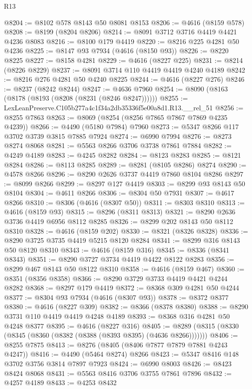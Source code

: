 \begin{lexlean}{R13}
\begin{coremodule}
@8204 := @8102 @578 @8143 @50 @8081 @8153
@8206 := @4616 (@8159 @578)
@8208 := @8199 (@8204 @8206)
@8214 := @8091 @3712 @3716 @4419 @4421 @4236 @8083
@8216 := @8100 @179 @4419
@8220 := @8216 @225 @4281 @50 @4236
@8225 := @8147 @93 @7934 (@4616 (@8150 @93))
@8226 := @8220 @8225
@8227 := @8158 @4281
@8229 := @4616 (@8227 @225)
@8231 := @8214 (@8226 @8229)
@8237 := @8091 @3714 @110 @4419 @4419 @4240 @4189
@8242 := @8216 @276 @4281 @50 @4240 @8225
@8244 := @4616 (@8227 @276)
@8246 := @8237 (@8242 @8244)
@8247 := @4636 @7960
@8254 := @8090 (@8163 (@8178 (@8193 (@8208 (@8231 (@8246 @8247))))))
@8255 := LexLeanPreserve.C105b277a4c1f34a2db35336f5e00a8d1.R13.__rel_51
@8256 := @8255 @7863
@8263 := @8069 (@8254 (@8256 @7865 @7867 @7869 @4235 @4239))
@8266 := @4490 (@5180 @7984) @7960
@8273 := @5347 @8266 @117 @3702 @3739 @3815 @7885 @7924
@8274 := @6990 @7994
@8276 := @8273 @8274 @8068
@8281 := @5563 @8266 @3706 @3738 @7861 @7884
@8282 := @4249 @4189
@8283 := @4245 @8282
@8284 := @8123 @8283
@8285 := @8121 @8284
@8286 := @8113 @8285
@8289 := @8281 (@8105 @8286) @8274
@8290 := @4578 @8266
@8296 := @8290 @2626 @3737 @4419 @7860 @8104 @8286
@8297 := @8099 @8266
@8299 := @8297 @127 @4419
@8303 := @8299 @93 @8143 @50 @8104
@8304 := @4611 @8266
@8306 := @8304 @50 @7931
@8307 := @4617 @8266
@8310 := @8306 (@4616 (@8307 @50))
@8311 := @8303 @8310
@8313 := @4616 (@8159 @93)
@8315 := @8296 (@8311 @8313)
@8321 := @8290 @2636 @3736 @4419 @6956 @8112 @8285
@8326 := @8299 @202 @8143 @50 @8112 @8310
@8328 := @4616 (@8159 @202)
@8330 := @8321 (@8326 @8328)
@8336 := @8290 @3725 @3735 @4419 @5215 @8120 @8284
@8341 := @8299 @316 @8143 @50 @8120 @8310
@8343 := @4616 (@8159 @316)
@8345 := @8336 (@8341 @8343)
@8351 := @8290 @3727 @3734 @4419 @4422 @8122 @8283
@8356 := @8299 @467 @8143 @50 @8122 @8310
@8358 := @4616 (@8159 @467)
@8360 := @8351 (@8356 @8358)
@8366 := @8290 @3729 @3733 @4419 @4421 @4244 @8282
@8368 := @8297 @179 @4419
@8372 := @8368 @309 @4281 @50 @4244
@8377 := @8304 @93 @7934 (@4616 (@8307 @93))
@8378 := @8372 @8377
@8380 := @4616 (@8227 @309)
@8382 := @8366 (@8378 @8380)
@8388 := @8290 @3731 @110 @4419 @4419 @4248 @4189
@8393 := @8368 @316 @4281 @50 @4248 @8377
@8395 := @4616 (@8227 @316)
@8405 := @8289 (@8315 (@8330 (@8345 (@8360 (@8382 (@8388 (@8393 @8395) (@4636 @8266)))))))
@8406 := @8255 @7875
@8413 := @8276 (@8405 (@8406 @7877 @7879 @7881 @4243 @4247))
@8416 := @4490 (@5464 @8274) @8266
@8423 := @5347 @8416 @148 @3702 @3756 @3814 @7897 @7923
@8424 := @6990 @8003
@8426 := @8423 @8424 @8068
@8431 := @5563 @8416 @3706 @3755 @7861 @7896
@8432 := @4257 @4189
@8433 := @4253 @8432

\end{coremodule}
\end{lexlean}
